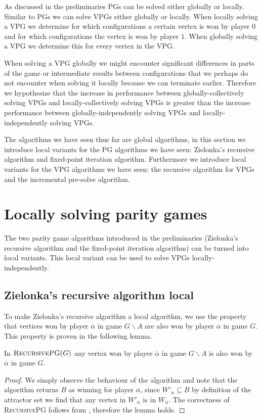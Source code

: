 As discussed in the preliminaries PGs can be solved either globally or locally. Similar to PGs we can solve VPGs either globally or locally. When locally solving a VPG we determine for which configurations a certain vertex is won by player $0$ and for which configurations the vertex is won by player $1$. When globally solving a VPG we determine this for every vertex in the VPG.

When solving a VPG globally we might encounter significant differences in parts of the game or intermediate results between configurations that we perhaps do not encounter when solving it locally because we can terminate earlier. Therefore we hypothesize that the increase in performance between globally-collectively solving VPGs and locally-collectively solving VPGs is greater than the increase performance between globally-independently solving VPGs and locally-independently solving VPGs.

The algorithms we have seen thus far are global algorithms, in this section we introduce local variants for the PG algorithms we have seen: Zielonka's recursive algorithm and fixed-point iteration algorithm. Furthermore we introduce local variants for the VPG algorithms we have seen: the recursive algorithm for VPGs and the incremental pre-solve algorithm.

\section{Locally solving parity games}
The two parity game algorithms introduced in the preliminaries (Zielonka's recursive algorithm and the fixed-point iteration algorithm) can be turned into local variants. This local variant can be used to solve VPGs locally-independently.

\subsection{Zielonka's recursive algorithm local}
\label{sec:zlnk_org_local}
To make Zielonka's recursive algorithm a local algorithm, we use the property that vertices won by player $\overline{\alpha}$ in game $G \backslash A$ are also won by player $\overline{\alpha}$ in game $G$. This property is proven in the following lemma.
\begin{lemma}
	\label{lem_overlinealphawinner}
	In $\textsc{RecursivePG}(G)$ any vertex won by player $\overline{\alpha}$ in game $G\backslash A$ is also won by $\overline{\alpha}$ in game $G$.
	\begin{proof}
		We simply observe the behaviour of the algorithm and note that the algorithm returns $B$ as winning for player $\overline{\alpha}$, since $W'_{\overline{\alpha}} \subseteq B$ by definition of the attractor set we find that any vertex in $W'_{\overline{\alpha}}$ is in $W_{\overline{\alpha}}$. The correctness of \textsc{RecursivePG} follows from \cite{ZIELONKA1998135}, therefore the lemma holds.
	\end{proof}
\end{lemma}

